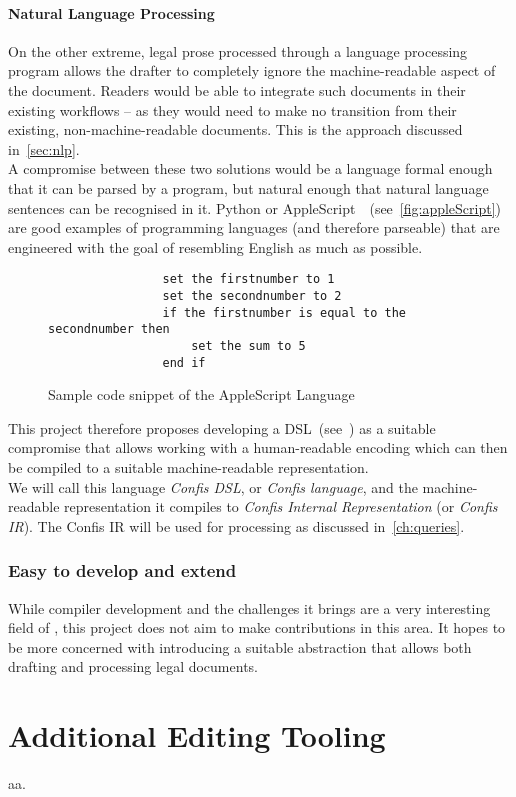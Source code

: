 \paragraph{Natural Language Processing}

On the other extreme, legal prose processed through a language processing program allows the drafter to completely ignore the machine-readable aspect of the document.
Readers would be able to integrate such documents in their existing workflows -- as they would need to make no transition from their existing, non-machine-readable documents.
This is the approach discussed in~\autoref{sec:nlp}.\\

A compromise between these two solutions would be a language formal enough that it can be parsed by a program, but natural enough that natural language sentences can be recognised in it.
Python or AppleScript~\cite{Sanderson2010appleScript}~(see~\autoref{fig:appleScript}) are good examples of programming languages (and therefore parseable) that are engineered with the goal of resembling English as much as possible.

\begin{figure}[h]
    \centering
    \begin{verbatim}
                set the firstnumber to 1
                set the secondnumber to 2
                if the firstnumber is equal to the secondnumber then
                    set the sum to 5
                end if
    \end{verbatim}
    \caption{Sample code snippet of the AppleScript Language~\cite{Sanderson2010appleScript}}
    \label{fig:appleScript}
\end{figure}

This project therefore proposes developing a DSL~(see~) as a suitable compromise that allows working with a human-readable encoding which can then be compiled to a suitable machine-readable representation.\\

We will call this language \emph{Confis DSL}, or \emph{Confis language}, and the machine-readable representation it compiles to \emph{Confis Internal Representation} (or \emph{Confis IR}).
The Confis IR will be used for processing as discussed in~\autoref{ch:queries}.

\subsubsection{Easy to develop and extend}

While compiler development and the challenges it brings are a very interesting field of \subjectname, this project does not aim to make contributions in this area.
It hopes to be more concerned with introducing a suitable abstraction that allows both drafting and processing legal documents.


\section{Additional Editing Tooling}\label{sec:additional-dsl-tooling}

aa.
